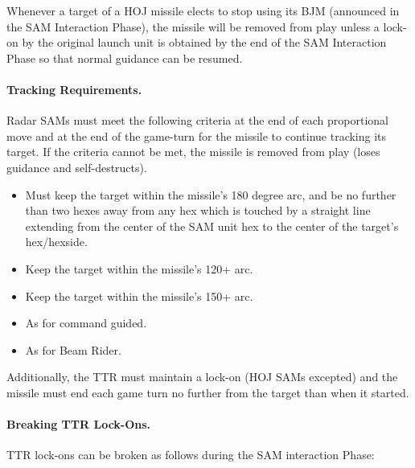 Whenever a target of a HOJ missile elects to stop using its BJM (announced in the SAM Interaction Phase), the missile will be removed from play unless a lock-on by the original launch unit is obtained by the end of the SAM Interaction Phase so that normal guidance can be resumed.

\paragraph{Tracking Requirements.} Radar SAMs must meet the following criteria at the end of each proportional move and at the end of the game-turn for the missile to continue tracking its target. If the criteria cannot be met, the missile is removed from play (loses guidance and self-destructs).

\begin{itemize}
    \item{} Must keep the target within the missile's 180 degree arc, and be no further than two hexes away from any hex which is touched by a straight line extending from the center of the SAM unit hex to the center of the target's hex/hexside.

    \item{} Keep the target within the missile's 120+ arc.

    \item{} Keep the target within the missile's 150+ arc.

    \item{} As for command guided.

    \item{} As for Beam Rider.
\end{itemize}

Additionally, the TTR must maintain a lock-on (HOJ SAMs excepted) and the missile must end each game turn no further from the target than when it started.

\paragraph{Breaking TTR Lock-Ons.} TTR lock-ons can be broken as follows during the SAM interaction Phase:

